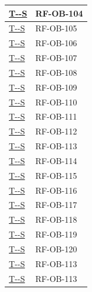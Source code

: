 \documentclass[a4paper,12pt]{article}
\newcounter{testsys}
\newcommand{\systestref}{%
  \hyperlink{T-\arabic{testsys}-S}{T-\arabic{testsys}-S}%
}
\begin{document}
\begin{center}
\begin{longtable}{|>{\centering\arraybackslash}p{5cm}|>{\centering\arraybackslash}p{9cm}|}
\stepcounter{testsys}
\systestref & RF-OB-104 \\
\hline

\stepcounter{testsys}
\systestref & RF-OB-105 \\
\hline

\stepcounter{testsys}
\systestref & RF-OB-106 \\
\hline

\stepcounter{testsys}
\systestref & RF-OB-107 \\
\hline

\stepcounter{testsys}
\systestref & RF-OB-108 \\
\hline

\stepcounter{testsys}
\systestref & RF-OB-109 \\
\hline

\stepcounter{testsys}
\systestref & RF-OB-110 \\
\hline

\stepcounter{testsys}
\systestref & RF-OB-111 \\
\hline

\stepcounter{testsys}
\systestref & RF-OB-112 \\
\hline

\stepcounter{testsys}
\systestref & RF-OB-113 \\
\hline

\stepcounter{testsys}
\systestref & RF-OB-114 \\
\hline

\stepcounter{testsys}
\systestref & RF-OB-115 \\
\hline

\stepcounter{testsys}
\systestref & RF-OB-116 \\
\hline

\stepcounter{testsys}
\systestref & RF-OB-117 \\
\hline

\stepcounter{testsys}
\systestref & RF-OB-118 \\
\hline

\stepcounter{testsys}
\systestref & RF-OB-119 \\
\hline

\stepcounter{testsys}
\systestref & RF-OB-120 \\
\hline

\stepcounter{testsys}
\systestref & RF-OB-113 \\
\hline

\stepcounter{testsys}
\systestref & RF-OB-113 \\
\hline


\end{longtable}
\end{center}
\end{document}
